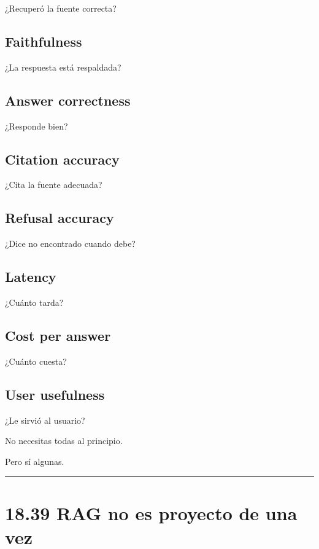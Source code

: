¿Recuperó la fuente correcta?

\subsection{Faithfulness}\label{faithfulness}

¿La respuesta está respaldada?

\subsection{Answer correctness}\label{answer-correctness}

¿Responde bien?

\subsection{Citation accuracy}\label{citation-accuracy}

¿Cita la fuente adecuada?

\subsection{Refusal accuracy}\label{refusal-accuracy}

¿Dice no encontrado cuando debe?

\subsection{Latency}\label{latency}

¿Cuánto tarda?

\subsection{Cost per answer}\label{cost-per-answer}

¿Cuánto cuesta?

\subsection{User usefulness}\label{user-usefulness}

¿Le sirvió al usuario?

No necesitas todas al principio.

Pero sí algunas.

\begin{center}\rule{0.5\linewidth}{0.5pt}\end{center}

\section{18.39 RAG no es proyecto de una
vez}\label{rag-no-es-proyecto-de-una-vez}

